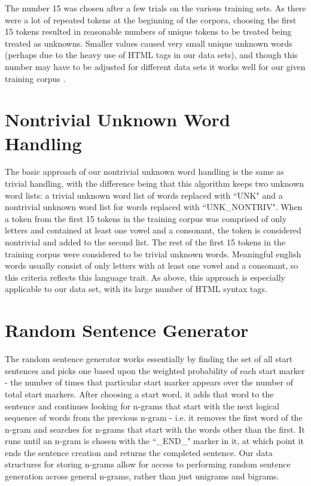 \documentclass[12pt]{article}
\begin{document}
The number 15 was chosen after a few trials on the various training sets. As there were a lot of repeated tokens at the beginning of the corpora, choosing the first 15 tokens resulted in reasonable numbers of unique tokens to be treated being treated as unknowns. Smaller values caused very small unique unknown words (perhaps due to the heavy use of HTML tags in our data sets), and though this number may have to be adjusted for different data sets it works well for our given training corpus .



\section{Nontrivial Unknown Word Handling}

The basic approach of our nontrivial unknown word handling is the same as trivial handling, with the difference being that this algorithm keeps two unknown word lists: a trivial unknown word list of words replaced with ``UNK" and a nontrivial unknown word list for words replaced with ``UNK\_NONTRIV". When a token from the first 15 tokens in the training corpus was comprised of only letters and contained at least one vowel and a consonant, the token is considered nontrivial and added to the second list. The rest of the first 15 tokens in the training corpus were considered to be trivial unknown words. Meaningful english words usually consist of only letters with at least one vowel and a consonant, so this criteria reflects this language trait. As above, this approach is especially applicable to our data set, with its large number of HTML syntax tags.

\section{Random Sentence Generator}
The random sentence generator works essentially by finding the set of all start sentences and picks one based upon the weighted probability of each start marker - the number of times that particular start marker appears over the number of total start markers. After choosing a start word, it adds that word to the sentence and continues looking for n-grams that start with the next logical sequence of words from the previous n-gram - i.e. it removes the first word of the n-gram and searches for n-grams that start with the words other than the first. It runs until an n-gram is chosen with the ``\_END\_" marker in it, at which point it ends the sentence creation and returns the completed sentence. Our data structures for storing n-grams allow for access to performing random sentence generation across general n-grams, rather than just unigrams and bigrams.  
\end{document}
